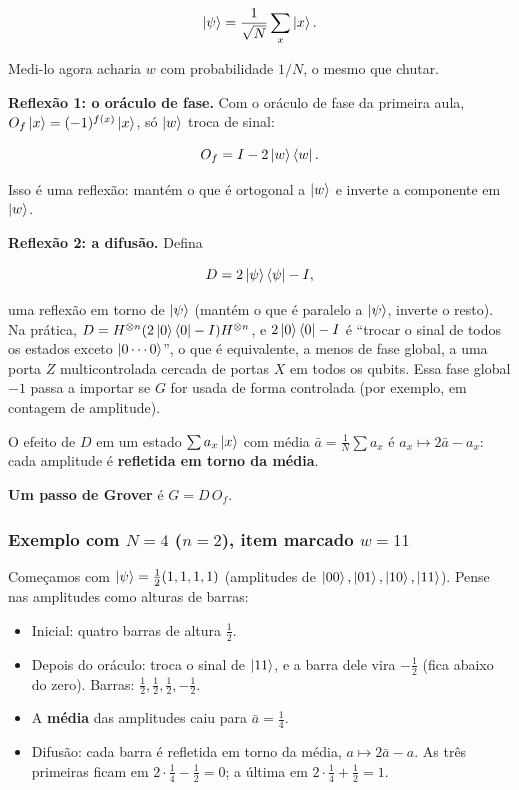 \[
\left|{\psi}\right>=\frac{1}{\sqrt N}\sum_x\left|{x}\right>.
\]

Medi-lo agora acharia \(w\) com probabilidade \(1/N\), o mesmo que chutar.

\textbf{Reflexão 1: o oráculo de fase.} Com o oráculo de fase da primeira aula, \(O_f\left|{x}\right>=(-1)^{f(x)}\left|{x}\right>\), só \(\left|{w}\right>\) troca de sinal:

\[
O_f=I-2\left|{w}\right>\left<{w}\right|.
\]

Isso é uma reflexão: mantém o que é ortogonal a \(\left|{w}\right>\) e inverte a componente em \(\left|{w}\right>\).

\textbf{Reflexão 2: a difusão.} Defina

\[
D=2\left|{\psi}\right>\left<{\psi}\right|-I,
\]

uma reflexão em torno de \(\left|{\psi}\right>\) (mantém o que é paralelo a \(\left|{\psi}\right>\), inverte o resto). Na prática, \(D=H^{\otimes n}(2\left|{0}\right>\left<{0}\right|-I)H^{\otimes n}\), e \(2\left|{0}\right>\left<{0}\right|-I\) é ``trocar o sinal de todos os estados exceto \(\left|{0\cdots0}\right>\)'', o que é equivalente, a menos de fase global, a uma porta \(Z\) multicontrolada cercada de portas \(X\) em todos os qubits. Essa fase global \(-1\) passa a importar se \(G\) for usada de forma controlada (por exemplo, em contagem de amplitude).

O efeito de \(D\) em um estado \(\sum a_x\left|{x}\right>\) com média \(\bar a=\tfrac1N\sum a_x\) é \(a_x\mapsto 2\bar a-a_x\): cada amplitude é \textbf{refletida em torno da média}.

\textbf{Um passo de Grover} é \(G=D\,O_f\).

\subsubsection{\texorpdfstring{Exemplo com \(N=4\) (\(n=2\)), item marcado \(w=11\)}{Exemplo com N=4 (n=2), item marcado w=11}}\label{exemplo-com-n4-n2-item-marcado-w11}

Começamos com \(\left|{\psi}\right>=\tfrac12(1,1,1,1)\) (amplitudes de \(\left|{00}\right>,\left|{01}\right>,\left|{10}\right>,\left|{11}\right>\)). Pense nas amplitudes como alturas de barras:

\begin{itemize}
\tightlist
\item
  Inicial: quatro barras de altura \(\tfrac12\).
\item
  Depois do oráculo: troca o sinal de \(\left|{11}\right>\), e a barra dele vira \(-\tfrac12\) (fica abaixo do zero). Barras: \(\tfrac12,\tfrac12,\tfrac12,-\tfrac12\).
\item
  A \textbf{média} das amplitudes caiu para \(\bar a=\tfrac14\).
\item
  Difusão: cada barra é refletida em torno da média, \(a\mapsto2\bar a-a\). As três primeiras ficam em \(2\cdot\tfrac14-\tfrac12=0\); a última em \(2\cdot\tfrac14+\tfrac12=1\).
\end{itemize}

